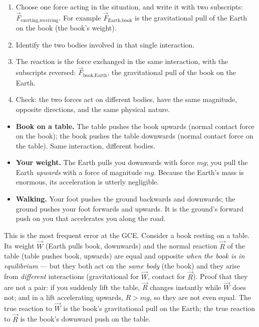 \documentclass[11pt]{article}
\begin{document}
\begin{methode}
\begin{enumerate}
\item Choose one force acting in the situation, and write it with two subscripts: $\vec{F}_{\text{exerting},\text{receiving}}$. For example $\vec{F}_{\text{Earth,book}}$ is the gravitational pull of the Earth on the book (the book's weight).
\item Identify the two bodies involved in that single interaction.
\item The reaction is the force exchanged in the same interaction, with the subscripts reversed: $\vec{F}_{\text{book,Earth}}$, the gravitational pull of the book on the Earth.
\item Check: the two forces act on different bodies, have the same magnitude, opposite directions, and the same physical nature.
\end{enumerate}
\end{methode}

\begin{exemplebox}
\begin{itemize}
\item \textbf{Book on a table.} The table pushes the book upwards (normal contact force on the book); the book pushes the table downwards (normal contact force on the table). Same interaction, different bodies.
\item \textbf{Your weight.} The Earth pulls you downwards with force $mg$; you pull the Earth \emph{upwards} with a force of magnitude $mg$. Because the Earth's mass is enormous, its acceleration is utterly negligible.
\item \textbf{Walking.} Your foot pushes the ground backwards and downwards; the ground pushes your foot forwards and upwards. It is the ground's forward push on you that accelerates you along the road.
\end{itemize}
\end{exemplebox}

\begin{attention}
This is the most frequent error at the GCE. Consider a book resting on a table. Its weight $\vec{W}$ (Earth pulls book, downwards) and the normal reaction $\vec{R}$ of the table (table pushes book, upwards) are equal and opposite \emph{when the book is in equilibrium} --- but they both act on the \emph{same body} (the book) and they arise from \emph{different} interactions (gravitational for $\vec{W}$, contact for $\vec{R}$). Proof that they are not a pair: if you suddenly lift the table, $\vec{R}$ changes instantly while $\vec{W}$ does not; and in a lift accelerating upwards, $R > mg$, so they are not even equal. The true reaction to $\vec{W}$ is the book's gravitational pull on the Earth; the true reaction to $\vec{R}$ is the book's downward push on the table.
\end{attention}
\end{document}
